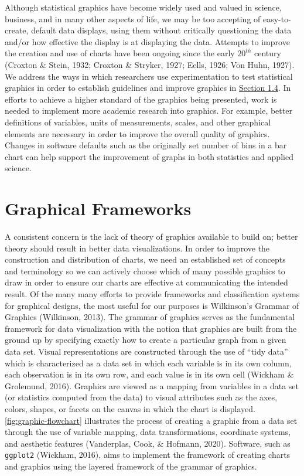 \documentclass[print]{nuthesis}
\begin{document}
Although statistical graphics have become widely used and valued in science, business, and in many other aspects of life, we may be too accepting of easy-to-create, default data displays, using them without critically questioning the data and/or how effective the display is at displaying the data. Attempts to improve the creation and use of charts have been ongoing since the early \(20^{th}\) century (Croxton \& Stein, 1932; Croxton \& Stryker, 1927; Eells, 1926; Von Huhn, 1927).
We address the ways in which researchers use experimentation to test statistical graphics in order to establish guidelines and improve graphics in \protect\hyperlink{testing-statistical-graphics}{Section 1.4}.
In efforts to achieve a higher standard of the graphics being presented, work is needed to implement more academic research into graphics.
For example, better definitions of variables, units of measurements, scales, and other graphical elements are necessary in order to improve the overall quality of graphics.
Changes in software defaults such as the originally set number of bins in a bar chart can help support the improvement of graphs in both statistics and applied science.

\hypertarget{graphical-frameworks}{%
\section{Graphical Frameworks}\label{graphical-frameworks}}

A consistent concern is the lack of theory of graphics available to build on; better theory should result in better data visualizations.
In order to improve the construction and distribution of charts, we need an established set of concepts and terminology so we can actively choose which of many possible graphics to draw in order to ensure our charts are effective at communicating the intended result.
Of the many many efforts to provide frameworks and classification systems for graphical designs, the most useful for our purposes is Wilkinson's Grammar of Graphics (Wilkinson, 2013).
The grammar of graphics serves as the fundamental framework for data visualization with the notion that graphics are built from the ground up by specifying exactly how to create a particular graph from a given data set.
Visual representations are constructed through the use of ``tidy data'' which is characterized as a data set in which each variable is in its own column, each observation is in its own row, and each value is in its own cell (Wickham \& Grolemund, 2016).
Graphics are viewed as a mapping from variables in a data set (or statistics computed from the data) to visual attributes such as the axes, colors, shapes, or facets on the canvas in which the chart is displayed.
\cref{fig:graphic-flowchart} illustrates the process of creating a graphic from a data set through the use of variable mapping, data transformations, coordinate systems, and aesthetic features (Vanderplas, Cook, \& Hofmann, 2020).
Software, such as \texttt{ggplot2} (Wickham, 2016), aims to implement the framework of creating charts and graphics using the layered framework of the grammar of graphics.
\end{document}
